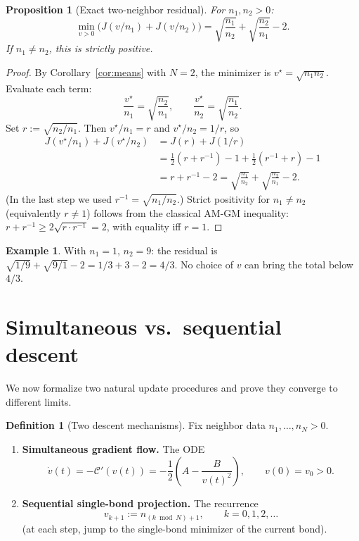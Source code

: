 \documentclass[11pt]{amsart}
\newtheorem{proposition}[theorem]{Proposition}
\theoremstyle{definition}
\newtheorem{definition}[theorem]{Definition}
\newtheorem{example}[theorem]{Example}
\theoremstyle{remark}
\begin{document}
\begin{proposition}[Exact two-neighbor residual]\label{prop:two-min}
For $n_1,n_2>0$:
\begin{equation}\label{eq:two-min}
\min_{v>0}\bigl(J(v/n_1)+J(v/n_2)\bigr)
=\sqrt{\frac{n_1}{n_2}}+\sqrt{\frac{n_2}{n_1}}-2.
\end{equation}
If $n_1\neq n_2$, this is strictly positive.
\end{proposition}
\begin{proof}
By Corollary~\ref{cor:means} with $N=2$, the minimizer is
$v^\star=\sqrt{n_1n_2}$.  Evaluate each term:
\[
\frac{v^\star}{n_1}=\sqrt{\frac{n_2}{n_1}},\qquad
\frac{v^\star}{n_2}=\sqrt{\frac{n_1}{n_2}}.
\]
Set $r:=\sqrt{n_2/n_1}$.  Then $v^\star/n_1=r$ and $v^\star/n_2=1/r$, so
\begin{align*}
J(v^\star/n_1)+J(v^\star/n_2)
&=J(r)+J(1/r) \\
&=\frac12(r+r^{-1})-1+\frac12(r^{-1}+r)-1 \\
&=r+r^{-1}-2
=\sqrt{\frac{n_1}{n_2}}+\sqrt{\frac{n_2}{n_1}}-2.
\end{align*}
(In the last step we used $r^{-1}=\sqrt{n_1/n_2}$.)
Strict positivity for $n_1\neq n_2$ (equivalently $r\neq 1$) follows from
the classical AM-GM inequality: $r+r^{-1}\ge2\sqrt{r\cdot r^{-1}}=2$,
with equality iff $r=1$.
\end{proof}

\begin{example}\label{ex:frustration}
With $n_1=1$, $n_2=9$: the residual is $\sqrt{1/9}+\sqrt{9/1}-2
=1/3+3-2=4/3$.  No choice of $v$ can bring the total below $4/3$.
\end{example}

\section{Simultaneous vs.\ sequential descent}\label{sec:descent}

We now formalize two natural update procedures and prove they converge
to different limits.

\begin{definition}[Two descent mechanisms]\label{def:dynamics}
Fix neighbor data $n_1,\dots,n_N>0$.
\begin{enumerate}[label=\textup{(\alph*)},nosep]
\item \textbf{Simultaneous gradient flow.}  The ODE
\[
\dot v(t)=-\mathcal C'(v(t))
=-\frac12\!\left(A-\frac{B}{v(t)^2}\right),
\qquad v(0)=v_0>0.
\]
\item \textbf{Sequential single-bond projection.}  The recurrence
\[
v_{k+1}:=n_{(k\bmod N)+1},\qquad k=0,1,2,\dots
\]
(at each step, jump to the single-bond minimizer of the current bond).
\end{enumerate}
\end{definition}
\end{document}
